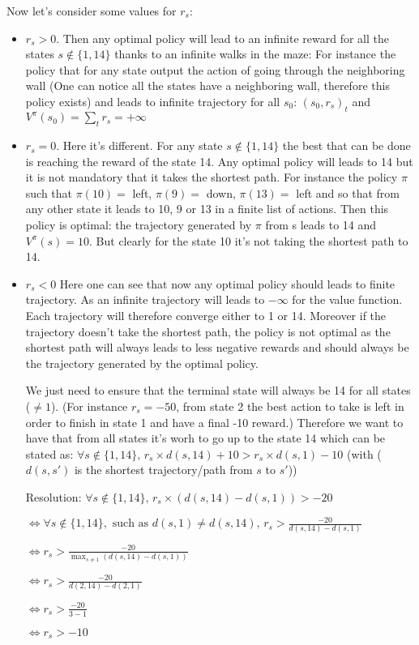 \documentclass[a4paper]{article}
\begin{document}
Now let's consider some values for $r_s$:

\begin{itemize}
    \item $r_s > 0$. Then any optimal policy will lead to an infinite reward for all the states $s \notin \{1, 14\}$ thanks to an infinite walks in the
          maze: For instance the policy that for any state output the action of going through the neighboring wall (One can notice all the states have
          a neighboring wall, therefore this policy exists) and leads to infinite trajectory for all $s_0$: $(s_0, r_s)_t$
          and $V^\pi(s_0) = \sum_t r_s = +\infty$
    \item $r_s = 0$. Here it's different. For any state $s \notin \{1, 14\}$ the best that can be done is reaching the reward of the state 14.
          Any optimal policy will leads to 14 but it is not mandatory that it takes the shortest path. For instance the policy $\pi$ such that
          $\pi(10) =$ left, $\pi(9) =$ down, $\pi(13) =$ left and so that from any other state it leads to 10, 9 or 13 in a finite list of actions.
          Then this policy is optimal: the trajectory generated by $\pi$ from s leads to 14 and $V^\pi(s) = 10$. But clearly for the state 10 it's
          not taking the shortest path to 14.
    \item $r_s < 0$ Here one can see that now any optimal policy should leads to finite trajectory. As an infinite trajectory will leads to $-\infty$
          for the value function. Each trajectory will therefore converge either to 1 or 14. Moreover if the trajectory doesn't take the shortest path,
          the policy is not optimal as the shortest path will always leads to less negative rewards and should always be the trajectory generated by
          the optimal policy.

          We just need to ensure that the terminal state will always be 14 for all states ($\neq 1$). (For instance $r_s = -50$,
          from state 2 the best action to take is left in order to finish in state 1 and have a final -10 reward.) Therefore we want to have that from all
          states it's worh to go up to the state 14 which can be stated as: $\forall s \notin \{1,14\},\, r_s \times d(s, 14) + 10 > r_s \times d(s, 1) - 10$
          (with ($d(s, s')$ is the shortest trajectory/path from $s$ to $s'$))

          Resolution: $\forall s \notin \{1,14\},\, r_s \times (d(s, 14) - d(s, 1)) > - 20$

          $\Leftrightarrow \forall s \notin \{1,14\},\text{ such as } d(s, 1) \neq d(s, 14),\, r_s > \frac{- 20}{d(s, 14) - d(s, 1)}$

          $\Leftrightarrow r_s > \frac{-20}{\max_{s\neq 1}(d(s, 14) - d(s, 1))}$

          $\Leftrightarrow r_s > \frac{-20}{d(2, 14) - d(2, 1)}$

          $\Leftrightarrow r_s > \frac{-20}{3 - 1}$

          $\Leftrightarrow r_s > -10$

\end{itemize}
\end{document}
